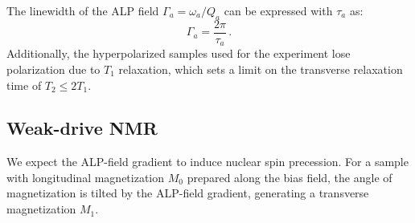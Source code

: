 The linewidth of the ALP field $\Gamma_a = \omega_a/Q_a$ can be expressed with $\tau_a$ as:
\begin{equation}
    \Gamma_a = \dfrac{2\pi}{\tau_a}
    \,.\label{eq:Gamma_a}
\end{equation}
Additionally, the hyperpolarized samples used for the experiment lose polarization due to $T_1$ relaxation, which sets a limit on the transverse relaxation time of $T_2\le 2T_1$.


\subsection{Weak-drive NMR}

We expect the ALP-field gradient to induce nuclear spin precession. 
For a sample with longitudinal magnetization $M_{0}$ prepared along the bias field, the angle of magnetization is tilted by the ALP-field gradient, generating a transverse magnetization $M_{1}$. 


